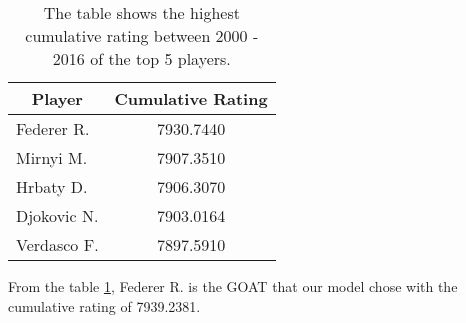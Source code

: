 \begin{table}[h]
\centering
\begin{tabular}{|l|c|}
\hline
\multicolumn{1}{|c|}{\textbf{Player}} & \textbf{Cumulative Rating}                \\ \hline
Federer R.                            & 7930.7440     \\\hline
Mirnyi M.                             & 7907.3510     \\\hline
Hrbaty D.                             & 7906.3070     \\\hline
Djokovic N.                           & 7903.0164     \\\hline
Verdasco F.                           & 7897.5910     \\\hline
\end{tabular}
\caption{The table shows the highest cumulative rating between 2000 - 2016 of the top 5 players.}
\label{tab_goat}
\end{table}

From the table \ref{tab_goat}, Federer R. is the GOAT that our model chose with the cumulative rating of 7939.2381. %

